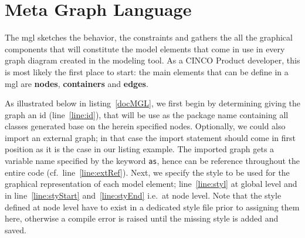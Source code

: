 \section{Meta Graph Language}\label{sec:MGL}

The \acrfull{mgl} sketches the behavior, the constraints and gathers the all the graphical components that will constitute the model elements that come in use in every graph diagram created in the modeling tool. As a CINCO Product developer, this is most likely the first place to start: the main elements that can be define in a \acrshort{mgl} are \textbf{nodes}, \textbf{containers} and \textbf{edges}. 

As illustrated below in listing~\ref{docMGL}, we first begin by determining giving the graph an id (line~\ref{line:id}), that will be use as the package name containing all classes generated base on the herein specified nodes. Optionally, we could also import an external graph; in that case the import statement should come in first position as it is the case in our listing example. The imported graph gets a variable name specified by the keyword \lstinline[language=MGL]{as}, hence can be reference throughout the entire code (cf.\ line~\ref{line:extRef}). Next, we specify the style to be used for the graphical representation of each model element; line~\ref{line:styl} at global level and in line~\ref{line:styStart} and~\ref{line:styEnd} i.e.\ at node level. Note that the style defined at node level have to exist in a dedicated style file prior to assigning them here, otherwise a compile error is raised until the missing style is added and saved.

